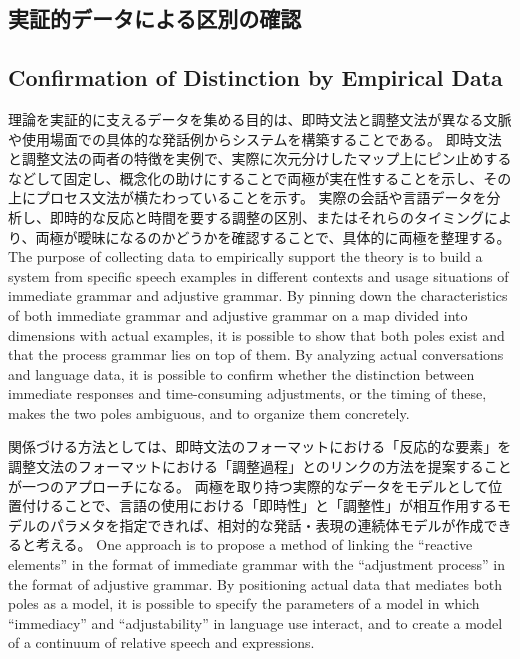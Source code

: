 \documentclass[a4paper,xelatex,ja=standard]{bxjsarticle}
\begin{document}
\ifJPN
\subsection{実証的データによる区別の確認}
\else
\subsection{Confirmation of Distinction by Empirical Data}
\fi

\ifJPN
理論を実証的に支えるデータを集める目的は、即時文法と調整文法が異なる文脈や使用場面での具体的な発話例からシステムを構築することである。
即時文法と調整文法の両者の特徴を実例で、実際に次元分けしたマップ上にピン止めするなどして固定し、概念化の助けにすることで両極が実在性することを示し、その上にプロセス文法が横たわっていることを示す。
実際の会話や言語データを分析し、即時的な反応と時間を要する調整の区別、またはそれらのタイミングにより、両極が曖昧になるのかどうかを確認することで、具体的に両極を整理する。
\else
The purpose of collecting data to empirically support the theory is to build a system from specific speech examples in different contexts and usage situations of immediate grammar and adjustive grammar.
By pinning down the characteristics of both immediate grammar and adjustive grammar on a map divided into dimensions with actual examples, it is possible to show that both poles exist and that the process grammar lies on top of them.
By analyzing actual conversations and language data, it is possible to confirm whether the distinction between immediate responses and time-consuming adjustments, or the timing of these, makes the two poles ambiguous, and to organize them concretely.
\fi

\ifJPN
関係づける方法としては、即時文法のフォーマットにおける「反応的な要素」を調整文法のフォーマットにおける「調整過程」とのリンクの方法を提案することが一つのアプローチになる。
両極を取り持つ実際的なデータをモデルとして位置付けることで、言語の使用における「即時性」と「調整性」が相互作用するモデルのパラメタを指定できれば、相対的な発話・表現の連続体モデルが作成できると考える。
\else
One approach is to propose a method of linking the ``reactive elements'' in the format of immediate grammar with the ``adjustment process'' in the format of adjustive grammar.
By positioning actual data that mediates both poles as a model, it is possible to specify the parameters of a model in which ``immediacy'' and ``adjustability'' in language use interact, and to create a model of a continuum of relative speech and expressions.
\fi

\end{document}

